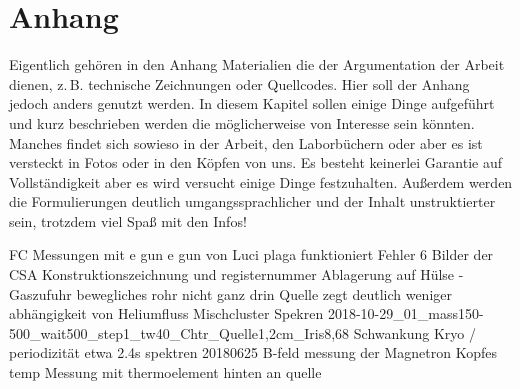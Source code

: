 \chapter{Anhang}
Eigentlich gehören in den Anhang Materialien die der Argumentation der Arbeit dienen, z.\,B. technische Zeichnungen oder Quellcodes.
Hier soll der Anhang jedoch anders genutzt werden.
In diesem Kapitel sollen einige Dinge aufgeführt und kurz beschrieben werden die möglicherweise von Interesse sein könnten.
Manches findet sich sowieso in der Arbeit, den Laborbüchern oder aber es ist versteckt in Fotos oder in den Köpfen von uns.
Es besteht keinerlei Garantie auf Vollständigkeit aber es wird versucht einige Dinge festzuhalten.
Außerdem werden die Formulierungen deutlich umgangssprachlicher und der Inhalt unstruktierter sein, trotzdem viel Spaß mit den Infos!

FC Messungen mit e gun
e gun von Luci plaga funktioniert
Fehler 6
Bilder der CSA
Konstruktionszeichnung und registernummer
Ablagerung auf Hülse - Gaszufuhr bewegliches rohr nicht ganz drin
Quelle zegt deutlich weniger abhängigkeit von Heliumfluss
Mischcluster Spekren 2018-10-29_01_mass150-500_wait500_step1_tw40_Chtr_Quelle1,2cm_Iris8,68
Schwankung Kryo / periodizität etwa 2.4s spektren 20180625
B-feld messung der Magnetron Kopfes
temp Messung mit thermoelement hinten an quelle

